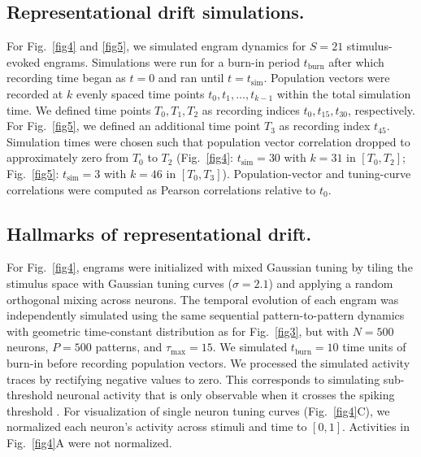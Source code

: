 \subsection{Representational drift simulations.}
For Fig.~\ref{fig4} and \ref{fig5}, we simulated engram dynamics for \mbox{$S=21$} stimulus-evoked engrams. Simulations were run for a burn-in period $t_\text{burn}$ after which recording time began as $t=0$ and ran until $t=t_\text{sim}$. Population vectors were recorded at $k$ evenly spaced time points $t_0, t_1, \dots, t_{k-1}$ within the total simulation time. We defined time points $T_0, T_1, T_2$ as recording indices $t_0, t_{15}, t_{30}$, respectively. For Fig.~\ref{fig5}, we defined an additional time point $T_3$ as recording index $t_{45}$. Simulation times were chosen such that population vector correlation dropped to approximately zero from $T_0$ to $T_2$ (Fig.~\ref{fig4}: $t_\text{sim} = 30$ with $k=31$ in $[T_0,T_2]$; Fig.~\ref{fig5}: $t_\text{sim} = 3$ with $k=46$ in $[T_0,T_3]$). Population-vector and tuning-curve correlations were computed as Pearson correlations relative to $t_0$.


\subsection{Hallmarks of representational drift.}
For Fig.~\ref{fig4}, engrams were initialized with mixed Gaussian tuning by tiling the stimulus space with Gaussian tuning curves ($\sigma = 2.1$) and applying a random orthogonal mixing across neurons. The temporal evolution of each engram was independently simulated using the same sequential pattern-to-pattern dynamics with geometric time-constant distribution as for Fig.~\ref{fig3}, but with $N=500$ neurons, $P=500$ patterns, and $\tau_{\max}=15$. We simulated $t_{\text{burn}} = 10$ time units of burn-in before recording population vectors. We processed the simulated activity traces by rectifying negative values to zero. This corresponds to simulating sub-threshold neuronal activity that is only observable when it crosses the spiking threshold \citep{Mainali2025}.  For visualization of single neuron tuning curves (Fig.~\ref{fig4}C), we normalized each neuron's activity across stimuli and time to $[0,1]$. Activities in Fig.~\ref{fig4}A were not normalized.

